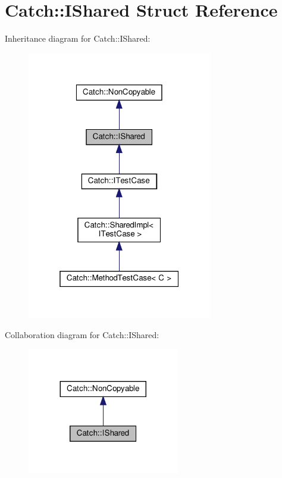 \hypertarget{structCatch_1_1IShared}{}\section{Catch\+:\+:I\+Shared Struct Reference}
\label{structCatch_1_1IShared}


Inheritance diagram for Catch\+:\+:I\+Shared\+:\nopagebreak
\begin{figure}[H]
\begin{center}
\leavevmode
\includegraphics[width=229pt]{structCatch_1_1IShared__inherit__graph}
\end{center}
\end{figure}


Collaboration diagram for Catch\+:\+:I\+Shared\+:\nopagebreak
\begin{figure}[H]
\begin{center}
\leavevmode
\includegraphics[width=188pt]{structCatch_1_1IShared__coll__graph}
\end{center}
\end{figure}
